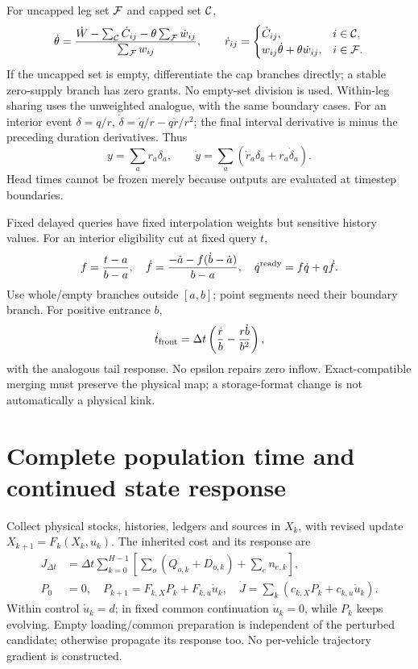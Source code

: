 \documentclass[10pt,a4paper]{article}
\begin{document}
For uncapped leg set ${\cal F}$ and capped set ${\cal C}$,
\begin{equation}
 \dot\theta=
 \frac{\dot W-\sum_{\cal C}\dot C_{ij}
               -\theta\sum_{\cal F}\dot w_{ij}}
      {\sum_{\cal F}w_{ij}},\qquad
 \dot r_{ij}=
 \begin{cases}
 \dot C_{ij},&i\in{\cal C},\\
 w_{ij}\dot\theta+\theta\dot w_{ij},&i\in{\cal F}.
 \end{cases}
 \label{eq:sharing-derivative}
\end{equation}
If the uncapped set is empty, differentiate the cap branches directly;
a stable zero-supply branch has zero grants. No empty-set division is used.
Within-leg sharing uses the unweighted analogue, with the same boundary cases.
For an interior event $\delta=q/r$,
$\dot\delta=\dot q/r-q\dot r/r^2$; the final interval derivative is minus
the preceding duration derivatives. Thus
\begin{equation}
 y=\sum_a r_a\delta_a,\qquad
 \dot y=\sum_a(\dot r_a\delta_a+r_a\dot\delta_a).
 \label{eq:service-derivative}
\end{equation}
Head times cannot be frozen merely because outputs are evaluated at
timestep boundaries.

Fixed delayed queries have fixed interpolation weights but sensitive
history values. For an interior eligibility cut at fixed query $t$,
\begin{equation}
 f=\frac{t-a}{b-a},\quad
 \dot f=\frac{-\dot a-f(\dot b-\dot a)}{b-a},\quad
 \dot q^{\rm ready}=f\dot q+q\dot f.
 \label{eq:eligibility-derivative}
\end{equation}
Use whole/empty branches outside $[a,b]$; point segments need their
boundary branch. For positive entrance $b$,
\begin{equation}
 \dot t_{\rm front}
 =\Delta t\left(\frac{\dot r}{b}-\frac{r\dot b}{b^2}\right),
 \label{eq:entry-derivative}
\end{equation}
with the analogous tail response. No epsilon repairs zero inflow.
Exact-compatible merging must preserve the physical map; a storage-format
change is not automatically a physical kink.

\section{Complete population time and continued state response}

Collect physical stocks, histories, ledgers and sources in $X_k$, with
revised update $X_{k+1}=F_k(X_k,u_k)$. The inherited cost and its response are
\begin{align}
 J_{\Delta t}
 &=\Delta t\sum_{k=0}^{H-1}
    \left[\sum_o(Q_{o,k}+D_{o,k})+\sum_en_{e,k}\right],
 \label{eq:tst}\\
 P_0&=0,\quad
 P_{k+1}=F_{k,X}P_k+F_{k,u}\dot u_k,\quad
 \dot J=\sum_k(c_{k,X}P_k+c_{k,u}\dot u_k).
 \label{eq:state-sensitivity}
\end{align}
Within control $\dot u_k=d$; in fixed common continuation $\dot u_k=0$,
while $P_k$ keeps evolving. Empty loading/common preparation is independent
of the perturbed candidate; otherwise propagate its response too.
No per-vehicle trajectory gradient is constructed.
\end{document}
